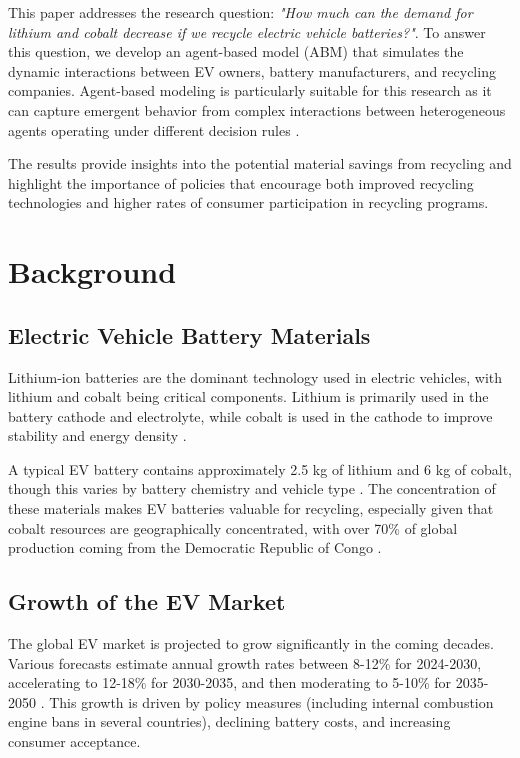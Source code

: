 \documentclass[10pt,a4paper,twocolumn]{article}
\begin{document}
This paper addresses the research question: \textit{"How much can the demand for lithium and cobalt decrease if we recycle electric vehicle batteries?"}. To answer this question, we develop an agent-based model (ABM) that simulates the dynamic interactions between EV owners, battery manufacturers, and recycling companies. Agent-based modeling is particularly suitable for this research as it can capture emergent behavior from complex interactions between heterogeneous agents operating under different decision rules \citep{bonabeau2002}.

The results provide insights into the potential material savings from recycling and highlight the importance of policies that encourage both improved recycling technologies and higher rates of consumer participation in recycling programs.

\section{Background}
\label{sec:background}

\subsection{Electric Vehicle Battery Materials}

Lithium-ion batteries are the dominant technology used in electric vehicles, with lithium and cobalt being critical components. Lithium is primarily used in the battery cathode and electrolyte, while cobalt is used in the cathode to improve stability and energy density \citep{xu2017}. 

A typical EV battery contains approximately 2.5 kg of lithium and 6 kg of cobalt, though this varies by battery chemistry and vehicle type \citep{ellingsen2016}. The concentration of these materials makes EV batteries valuable for recycling, especially given that cobalt resources are geographically concentrated, with over 70\% of global production coming from the Democratic Republic of Congo \citep{usgs2020}.

\subsection{Growth of the EV Market}

The global EV market is projected to grow significantly in the coming decades. Various forecasts estimate annual growth rates between 8-12\% for 2024-2030, accelerating to 12-18\% for 2030-2035, and then moderating to 5-10\% for 2035-2050 \citep{elaadoutlook}. This growth is driven by policy measures (including internal combustion engine bans in several countries), declining battery costs, and increasing consumer acceptance.
\end{document}
